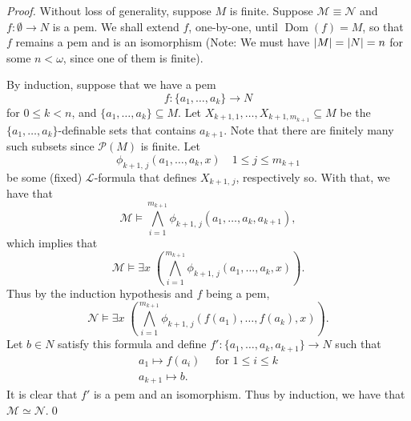 \documentclass[notoc,notitlepage]{tufte-book}
\DeclareMathOperator{\Dom}{Dom }
\begin{document}
\begin{proof}
  Without loss of generality, suppose $M$ is finite. Suppose $\mathcal{M} \equiv \mathcal{N}$ and $f : \emptyset \to N$ is a pem. We shall extend $f$, one-by-one, until $\Dom(f) = M$, so that $f$ remains a pem and is an isomorphism (Note: We must have $\left|M\right| = \left|N\right| = n$ for some $n < \omega$, since one of them is finite).

  By induction, suppose that we have a pem
  \begin{equation*}
    f : \{ a_1, \ldots, a_k \} \to N
  \end{equation*}
  for $0 \leq k < n$, and $\{ a_1, \ldots, a_k \} \subseteq M$. Let $X_{k + 1, 1}, \ldots, X_{k + 1, m_{k + 1}} \subseteq M$ be the $\{ a_1, \ldots, a_k \}$-definable sets that contains $a_{k + 1}$. Note that there are finitely many such subsets since $\mathcal{P}(M)$ is finite. Let
  \begin{equation*}
    \phi_{k + 1, \, j} (a_1, \ldots, a_k, x) \quad 1 \leq j \leq m_{k + 1}
  \end{equation*}
  be some (fixed) $\mathcal{L}$-formula that defines $X_{k + 1, \, j}$, respectively so. With that, we have that
  \begin{equation*}
    \mathcal{M} \models \bigwedge_{i = 1}^{m_{k + 1}} \phi_{k + 1, \, j}(a_1, \ldots, a_k, a_{k + 1}),
  \end{equation*}
  which implies that
  \begin{equation*}
    \mathcal{M} \models \exists x \; \left( \bigwedge_{i = 1}^{m_{k + 1}} \phi_{k + 1, \, j} (a_1, \ldots, a_k, x) \right).
  \end{equation*}
  Thus by the induction hypothesis and $f$ being a pem,
  \begin{equation*}
    \mathcal{N} \models \exists x \; \left( \bigwedge_{i = 1}^{m_{k + 1}} \phi_{k + 1, \, j} \left(f(a_1), \ldots, f(a_k), x\right) \right).
  \end{equation*}
  Let $b \in N$ satisfy this formula and define $f' : \{ a_1, \ldots, a_k, a_{k + 1} \} \to N$ such that 
  \begin{gather*}
    a_1 \mapsto f(a_i) \quad \text{ for } 1 \leq i \leq k \\
    a_{k + 1} \mapsto b.
  \end{gather*}
  It is clear that $f'$ is a pem and an isomorphism. Thus by induction, we have that $\mathcal{M} \simeq \mathcal{N}$.\qed\
\end{proof}
\end{document}

